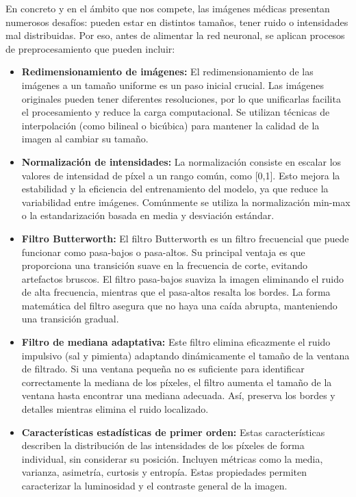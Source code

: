 \documentclass[12pt]{article}
\begin{document}
En concreto y en el ámbito que nos compete, las imágenes médicas presentan numerosos desafíos: pueden estar en distintos tamaños, tener ruido o intensidades mal distribuidas. Por eso, antes de alimentar la red neuronal, se aplican procesos de preprocesamiento que pueden incluir:

\begin{itemize}
  \item \textbf{Redimensionamiento de imágenes:} El redimensionamiento de las imágenes a un tamaño uniforme es un paso inicial crucial. Las imágenes originales pueden tener diferentes resoluciones, por lo que unificarlas facilita el procesamiento y reduce la carga computacional. Se utilizan técnicas de interpolación (como bilineal o bicúbica) para mantener la calidad de la imagen al cambiar su tamaño.

  \item \textbf{Normalización de intensidades:} La normalización consiste en escalar los valores de intensidad de píxel a un rango común, como [0,1]. Esto mejora la estabilidad y la eficiencia del entrenamiento del modelo, ya que reduce la variabilidad entre imágenes. Comúnmente se utiliza la normalización min-max o la estandarización basada en media y desviación estándar.

  \item \textbf{Filtro Butterworth:} El filtro Butterworth es un filtro frecuencial que puede funcionar como pasa-bajos o pasa-altos. Su principal ventaja es que proporciona una transición suave en la frecuencia de corte, evitando artefactos bruscos. El filtro pasa-bajos suaviza la imagen eliminando el ruido de alta frecuencia, mientras que el pasa-altos resalta los bordes. La forma matemática del filtro asegura que no haya una caída abrupta, manteniendo una transición gradual.

  \item \textbf{Filtro de mediana adaptativa:} Este filtro elimina eficazmente el ruido impulsivo (sal y pimienta) adaptando dinámicamente el tamaño de la ventana de filtrado. Si una ventana pequeña no es suficiente para identificar correctamente la mediana de los píxeles, el filtro aumenta el tamaño de la ventana hasta encontrar una mediana adecuada. Así, preserva los bordes y detalles mientras elimina el ruido localizado.

  \item \textbf{Características estadísticas de primer orden:} Estas características describen la distribución de las intensidades de los píxeles de forma individual, sin considerar su posición. Incluyen métricas como la media, varianza, asimetría, curtosis y entropía. Estas propiedades permiten caracterizar la luminosidad y el contraste general de la imagen.


\end{itemize}
\end{document}
